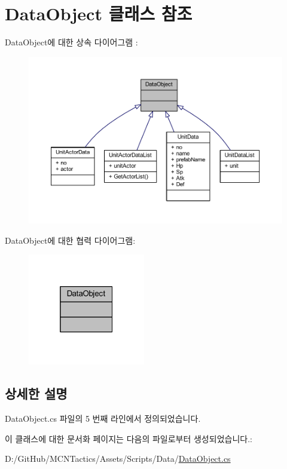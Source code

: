 \hypertarget{class_data_object}{}\section{Data\+Object 클래스 참조}
\label{class_data_object}


Data\+Object에 대한 상속 다이어그램 \+: 
\nopagebreak
\begin{figure}[H]
\begin{center}
\leavevmode
\includegraphics[width=350pt]{class_data_object__inherit__graph}
\end{center}
\end{figure}


Data\+Object에 대한 협력 다이어그램\+:\nopagebreak
\begin{figure}[H]
\begin{center}
\leavevmode
\includegraphics[width=145pt]{class_data_object__coll__graph}
\end{center}
\end{figure}


\subsection{상세한 설명}


Data\+Object.\+cs 파일의 5 번째 라인에서 정의되었습니다.



이 클래스에 대한 문서화 페이지는 다음의 파일로부터 생성되었습니다.\+:\begin{DoxyCompactItemize}
\item 
D\+:/\+Git\+Hub/\+M\+C\+N\+Tactics/\+Assets/\+Scripts/\+Data/\hyperlink{_data_object_8cs}{Data\+Object.\+cs}\end{DoxyCompactItemize}
